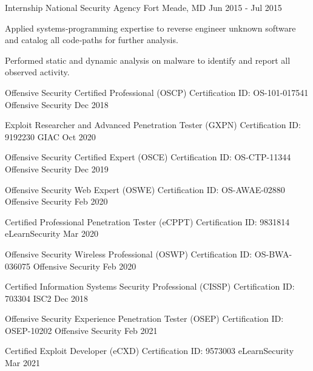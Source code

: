 \documentclass[11pt, letterpaper]{awesome-cv}
\begin{document}
\begin{cventries}
  \cventry
    {Internship}
    {National Security Agency}
    {Fort Meade, MD}
    {Jun 2015 - Jul 2015}
    {
      \begin{cvitems}
        \item{Applied systems‑programming expertise to reverse engineer unknown software and catalog all code‑paths for further analysis.}
        \item{Performed static and dynamic analysis on malware to identify and report all observed activity.}
      \end{cvitems}
    }



\end{cventries}

\begin{cvhonors}

  \cvhonor
    {Offensive Security Certified Professional (OSCP)}
    {Certification ID: OS-101-017541}
    {Offensive Security}
    {Dec 2018}

  \cvhonor
    {Exploit Researcher and Advanced Penetration Tester (GXPN)}
    {Certification ID: 9192230}
    {GIAC}
    {Oct 2020}

  \cvhonor
    {Offensive Security Certified Expert (OSCE)}
    {Certification ID: OS-CTP-11344}
    {Offensive Security}
    {Dec 2019}

  \cvhonor
    {Offensive Security Web Expert (OSWE)}
    {Certification ID: OS-AWAE-02880}
    {Offensive Security}
    {Feb 2020}

  \cvhonor
    {Certified Professional Penetration Tester (eCPPT)}
    {Certification ID: 9831814}
    {eLearnSecurity}
    {Mar 2020}

  \cvhonor
    {Offensive Security Wireless Professional (OSWP)}
    {Certification ID: OS-BWA-036075}
    {Offensive Security}
    {Feb 2020}

  \cvhonor
    {Certified Information Systems Security Professional (CISSP)}
    {Certification ID: 703304}
    {ISC2}
    {Dec 2018}

  \cvhonor
    {Offensive Security Experience Penetration Tester (OSEP)}
    {Certification ID: OSEP-10202}
    {Offensive Security}
    {Feb 2021}

  \cvhonor
    {Certified Exploit Developer (eCXD)}
    {Certification ID: 9573003}
    {eLearnSecurity}
    {Mar 2021}


\end{cvhonors}
\end{document}
